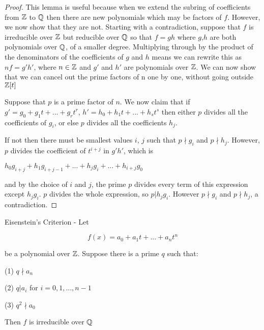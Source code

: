 \begin{proof}
This lemma is useful because when we extend the subring of coefficients from $\mathbb Z$ to $\mathbb Q$ then there are new polynomials which may be factors of $f$. However, we now show that they are not. Starting with a contradiction, suppose that $f$ is irreducible over $\mathbb Z$ but reducible over $\mathbb Q$ so that $f = g h$ where $g$,$h$ are both polynomials over $\mathbb Q$, of a smaller degree. Multiplying through by the product of the denominators of the coefficients of $g$ and $h$ means we can rewrite this as $n f = g' h'$, where $n \in \mathbb Z$ and $g'$ and $h'$ are polynomials over $\mathbb Z$. We can now show that we can cancel out the prime factors of n one by one, without going outside $\mathbb Z[t]$

Suppose that $p$ is a prime factor of $n$. We now claim that if $g' = g_0 + g_1 t +...+ g_r t^r$, $h' = h_0 + h_1 t +...+ h_s t^s$ then either $p$ divides all the coefficients of $g_i$, or else $p$ divides all the coefficients $h_j$.

If not then there must be smallest values $i$, $j$ such that $p \nmid g_i$ and $p \nmid h_j$. However, $p$ divides the coefficient of $t^{i+j}$ in $g' h'$, which is 

$h_0 g_{i+j} + h_1 g_{i+j-1} +...+ h_j g_i +...+ h_{i+j} g_0$

and by the choice of $i$ and $j$, the prime $p$ divides every term of this expression except $h_j g_i$. $p$ divides the whole expression, so $p | h_j g_i$. However $p \nmid g_i$ and $p \nmid h_j$, a contradiction.
\end{proof}

\begin{theorem}
    Eisenstein's Criterion - Let
    
    $$f(x) = a_0 + a_1 t + ... + a_n t^n$$
    
    be a polynomial over $\mathbb Z$. Suppose there is a prime $q$ such that:
    
    (1) $q \nmid a_n$

    (2) $q | a_i$ for $i = {0, 1,..., n-1}$

    (3) $q^2 \nmid a_0$

    Then $f$ is irreducible over $\mathbb Q$
\end{theorem}

